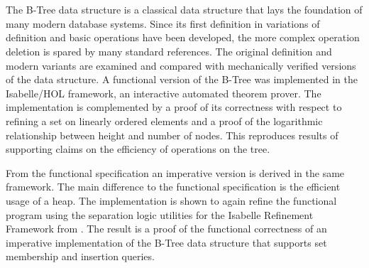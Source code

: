 \chapter{\abstractname}

The B-Tree data structure is a classical data structure
that lays the foundation of many modern database systems.
Since its first definition in \parencite{DBLP:journals/acta/BayerM72}
variations of definition and basic operations have been developed,
the more complex operation deletion is spared by many
standard references.
The original definition and modern variants are examined and compared
with mechanically verified versions of the data structure.
A functional version of the B-Tree
was implemented in the Isabelle/HOL framework, an interactive automated theorem prover.
The implementation is complemented by a proof of its correctness
with respect to refining a set on linearly ordered elements
and a proof of the logarithmic relationship between height and number of nodes.
This reproduces results of \parencite{DBLP:journals/acta/BayerM72}
supporting claims on the efficiency of
operations on the tree.

From the functional specification an imperative version is
derived in the same framework.
The main difference to the functional specification is the efficient
usage of a heap.
The implementation is shown to again refine the functional program
using the separation logic utilities for the Isabelle Refinement Framework from
\parencite{DBLP:journals/jar/Lammich19}.
The result is a proof of the functional correctness
of an imperative implementation of the B-Tree data structure
that supports set membership and insertion queries.





